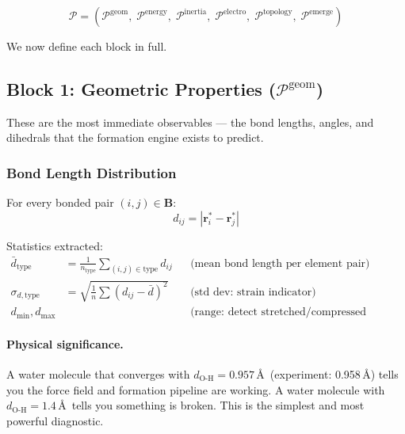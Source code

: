 \documentclass[11pt, a4paper, oneside]{article}
\theoremstyle{definition}
\theoremstyle{remark}
\begin{document}
\begin{equation}
\label{eq:property-record}
\mathcal{P} = (\mathcal{P}^{\text{geom}},\;
               \mathcal{P}^{\text{energy}},\;
               \mathcal{P}^{\text{inertia}},\;
               \mathcal{P}^{\text{electro}},\;
               \mathcal{P}^{\text{topology}},\;
               \mathcal{P}^{\text{emerge}})
\end{equation}

We now define each block in full.

\subsection{Block 1: Geometric Properties ($\mathcal{P}^{\text{geom}}$)}
\label{sec:block-geom}

These are the most immediate observables — the bond lengths, angles,
and dihedrals that the formation engine exists to predict.

\subsubsection{Bond Length Distribution}

For every bonded pair $(i,j) \in \mathbf{B}$:
\begin{equation}
d_{ij} = |\mathbf{r}_i^* - \mathbf{r}_j^*|
\end{equation}

Statistics extracted:
\begin{align}
\bar{d}_{\text{type}} &= \frac{1}{n_{\text{type}}} \sum_{(i,j)\in\text{type}} d_{ij}
  && \text{(mean bond length per element pair)} \\
\sigma_{d,\text{type}} &= \sqrt{\frac{1}{n}\sum(d_{ij} - \bar{d})^2}
  && \text{(std dev: strain indicator)} \\
d_{\min}, d_{\max} &
  && \text{(range: detect stretched/compressed bonds)}
\end{align}

\paragraph{Physical significance.}
A water molecule that converges with $d_{\text{O-H}} = 0.957$\,\AA\
(experiment: 0.958\,\AA) tells you the force field and formation
pipeline are working.  A water molecule with $d_{\text{O-H}} = 1.4$\,\AA\
tells you something is broken.  This is the simplest and most powerful
diagnostic.
\end{document}
